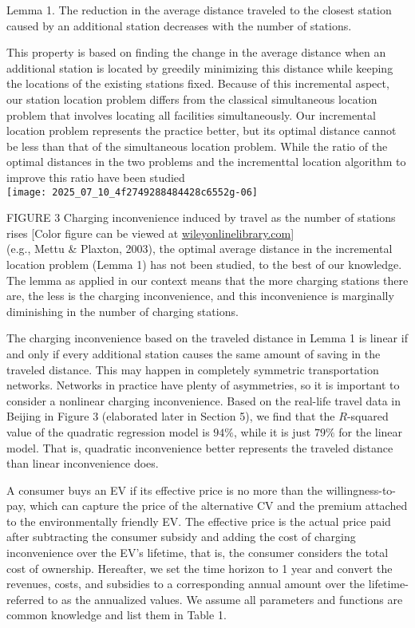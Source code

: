 \documentclass[10pt]{article}
\begin{document}
Lemma 1. The reduction in the average distance traveled to the closest station caused by an additional station decreases with the number of stations.

This property is based on finding the change in the average distance when an additional station is located by greedily minimizing this distance while keeping the locations of the existing stations fixed. Because of this incremental aspect, our station location problem differs from the classical simultaneous location problem that involves locating all facilities simultaneously. Our incremental location problem represents the practice better, but its optimal distance cannot be less than that of the simultaneous location problem. While the ratio of the optimal distances in the two problems and the incrementtal location algorithm to improve this ratio have been studied\\
\texttt{[image: 2025\_07\_10\_4f2749288484428c6552g-06]}

FIGURE 3 Charging inconvenience induced by travel as the number of stations rises [Color figure can be viewed at \href{http://wileyonlinelibrary.com}{wileyonlinelibrary.com}]\\
(e.g., Mettu \& Plaxton, 2003), the optimal average distance in the incremental location problem (Lemma 1) has not been studied, to the best of our knowledge. The lemma as applied in our context means that the more charging stations there are, the less is the charging inconvenience, and this inconvenience is marginally diminishing in the number of charging stations.

The charging inconvenience based on the traveled distance in Lemma 1 is linear if and only if every additional station causes the same amount of saving in the traveled distance. This may happen in completely symmetric transportation networks. Networks in practice have plenty of asymmetries, so it is important to consider a nonlinear charging inconvenience. Based on the real-life travel data in Beijing in Figure 3 (elaborated later in Section 5), we find that the $R$-squared value of the quadratic regression model is $94 \%$, while it is just $79 \%$ for the linear model. That is, quadratic inconvenience better represents the traveled distance than linear inconvenience does.

A consumer buys an EV if its effective price is no more than the willingness-to-pay, which can capture the price of the alternative CV and the premium attached to the environmentally friendly EV. The effective price is the actual price paid after subtracting the consumer subsidy and adding the cost of charging inconvenience over the EV's lifetime, that is, the consumer considers the total cost of ownership. Hereafter, we set the time horizon to 1 year and convert the revenues, costs, and subsidies to a corresponding annual amount over the lifetime-referred to as the annualized values. We assume all parameters and functions are common knowledge and list them in Table 1.
\end{document}

